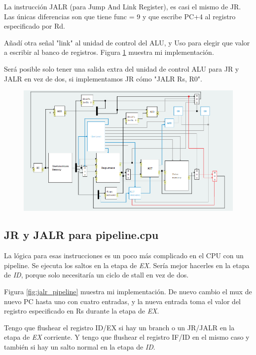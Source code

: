 \documentclass[a4paper]{article}
\begin{document}
La instrucción JALR (para Jump And Link Register), es casi el mismo de JR. Las únicas diferencias son que tiene func = 9 y que escribe PC+4 al registro especificado por Rd.

Añadí otra señal "link" al unidad de control del ALU, y Uso para elegir que valor a escribir al banco de registros. Figura \ref{fig:jalr_unicycle} muestra mi implementación.

Será posible solo tener una salida extra del unidad de control ALU para JR y JALR en vez de dos, si implementamos JR cómo "JALR Rs, R0".

\begin{figure}[h]
\centering
\includegraphics[scale=.6]{./img/jalr_unicycle.png}
\label{fig:jalr_unicycle}
\end{figure}

\subsection{JR y JALR para pipeline.cpu}

La lógica para esas instrucciones es un poco más complicado en el CPU con un pipeline. Se ejecuta los saltos en la etapa de \textit{EX}. Sería mejor hacerles en la etapa de \textit{ID}, porque solo necesitaría un ciclo de stall en vez de dos.

Figura \ref{fig:jalr_pipeline} muestra mi implementación. De nuevo cambio el mux de nuevo PC hasta uno con cuatro entradas, y la nueva entrada toma el valor del registro especificado en Rs durante la etapa de \textit{EX}.

Tengo que flushear el registro ID/EX si hay un branch o un JR/JALR en la etapa de \textit{EX} corriente. Y tengo que flushear el registro IF/ID en el mismo caso y también si hay un salto normal en la etapa de \textit{ID}.
\end{document}

